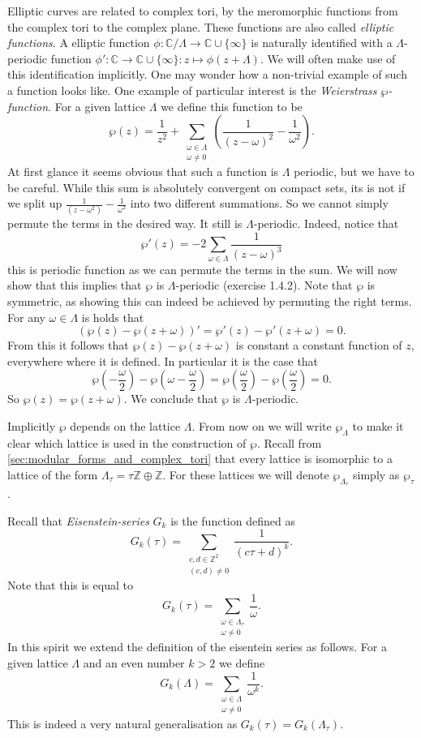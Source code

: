 \documentclass[a4paper]{article}
\theoremstyle{theoremdd}
\theoremstyle{definitiondd}
\theoremstyle{remarkdd}
\newcommand{\Z}{\mathbb{Z}}
\newcommand{\C}{\mathbb{C}}
\begin{document}
Elliptic curves are related to complex tori, by the meromorphic functions from the complex tori to the complex plane. These functions are also called \emph{elliptic functions}. 
A elliptic function $\phi: \C / \Lambda \to \C \cup \{\infty\} $ is naturally identified with a  $\Lambda$-periodic function $\phi': \C \to \C \cup \{\infty\}: z \mapsto \phi(z + \Lambda)$. 
We will often make use of this identification implicitly. 
One may wonder how a non-trivial example of such a function looks like. 
One example of particular interest is the \emph{Weierstrass $\wp$-function}. 
For a given lattice  $\Lambda$ we define this function to be \[
	\wp(z) = \frac{1}{z^2} + \sum_{\substack{\omega \in \Lambda \\ \omega \ne 0}}\left( \frac{1}{(z-\omega)^2} - \frac{1}{\omega^2} \right) 
.\] 
At first glance it seems obvious that such a function is $\Lambda$ periodic, but we have to be careful. 
While this sum is absolutely convergent on compact sets, its is not if we split up $\frac{1}{(z-\omega^2)} - \frac{1}{\omega^2}$ into two different summations. So we cannot simply permute the terms in the desired way. 
It still is $\Lambda$-periodic. Indeed, notice that  \[
	\wp'(z) = -2 \sum_{\omega \in \Lambda} \frac{1}{(z - \omega)^3}
\] 
this is periodic function as we can permute the terms in the sum.
We will now show that this implies that $\wp$ is $\Lambda$-periodic (exercise 1.4.2).
Note that $\wp$ is symmetric, as showing this can indeed be achieved by permuting the right terms.
For any $\omega \in \Lambda$ is holds that 
\[
	(\wp(z) - \wp(z + \omega))' = \wp'(z) - \wp'(z+ \omega) = 0 
.\] 
From this it follows that $\wp(z) - \wp(z + \omega)$ is constant a constant function of $z$, everywhere where it is defined.
In particular it is the case that \[
	\wp\left(-\frac{\omega}{2}\right) - \wp\left(\omega - \frac{\omega}{2}\right) = \wp\left(\frac{\omega}{2}\right) - \wp\left(\frac{\omega}{2}\right)  = 0 
.\] 
So $\wp(z) = \wp(z+ \omega)$. 
We conclude that $\wp$ is $\Lambda$-periodic.

Implicitly $\wp$ depends on the lattice $\Lambda$. 
From now on we will write  $\wp_\Lambda$ to make it clear which lattice is used in the construction of $\wp$. 
Recall from \cref{sec:modular_forms_and_complex_tori} that every lattice is isomorphic to a lattice of the form $\Lambda_\tau = \tau\Z \oplus \Z$. For these lattices we will denote $\wp_{\Lambda_\tau}$ simply as $\wp_\tau$.

Recall that \emph{Eisenstein-series} $G_k$ is the function defined as \[
	G_k(\tau) = \sum_{\substack{c, d \in \Z^2 \\ (c, d) \ne 0}} \frac{1}{(c\tau + d)^{k}}
.\] 
Note that this is equal to \[
	G_k(\tau) = \sum_{\substack{\omega \in \Lambda_\tau \\ \omega \ne 0}} \frac{1}{\omega}
.\] 
In this spirit we extend the definition of the eisentein series as follows. For a given lattice $\Lambda$ and an even number  $k > 2$ we define \[
	G_k(\Lambda) = \sum_{\substack{\omega \in \Lambda \\ \omega \ne 0}} \frac{1}{\omega^{k}}
.\] 
This is indeed a very natural generalisation as $G_k(\tau) = G_k(\Lambda_\tau)$.
\end{document}
